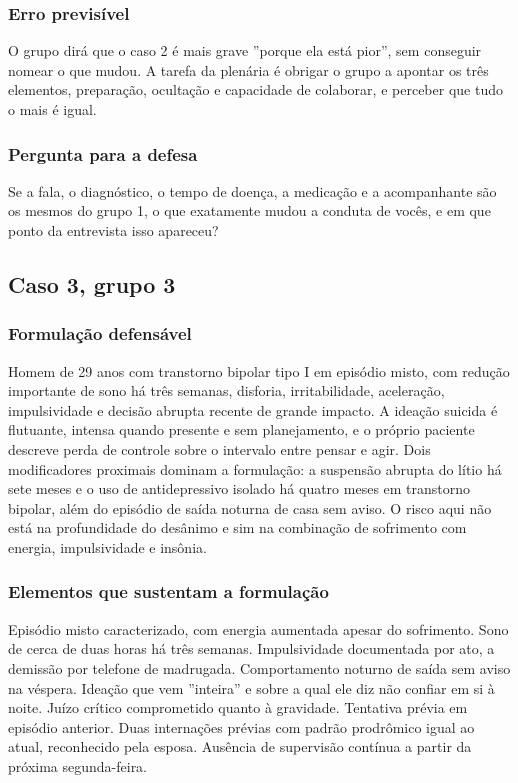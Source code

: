\subsubsection*{Erro previsível}

O grupo dirá que o caso 2 é mais grave ''porque ela está pior'', sem conseguir nomear o que mudou. A tarefa da plenária é obrigar o grupo a apontar os três elementos, preparação, ocultação e capacidade de colaborar, e perceber que tudo o mais é igual.

\subsubsection*{Pergunta para a defesa}

Se a fala, o diagnóstico, o tempo de doença, a medicação e a acompanhante são os mesmos do grupo 1, o que exatamente mudou a conduta de vocês, e em que ponto da entrevista isso apareceu?

\filete

\subsection*{Caso 3, grupo 3}

\subsubsection*{Formulação defensável}

Homem de 29 anos com transtorno bipolar tipo I em episódio misto, com redução importante de sono há três semanas, disforia, irritabilidade, aceleração, impulsividade e decisão abrupta recente de grande impacto. A ideação suicida é flutuante, intensa quando presente e sem planejamento, e o próprio paciente descreve perda de controle sobre o intervalo entre pensar e agir. Dois modificadores proximais dominam a formulação: a suspensão abrupta do lítio há sete meses e o uso de antidepressivo isolado há quatro meses em transtorno bipolar, além do episódio de saída noturna de casa sem aviso. O risco aqui não está na profundidade do desânimo e sim na combinação de sofrimento com energia, impulsividade e insônia.

\subsubsection*{Elementos que sustentam a formulação}

Episódio misto caracterizado, com energia aumentada apesar do sofrimento. Sono de cerca de duas horas há três semanas. Impulsividade documentada por ato, a demissão por telefone de madrugada. Comportamento noturno de saída sem aviso na véspera. Ideação que vem ''inteira'' e sobre a qual ele diz não confiar em si à noite. Juízo crítico comprometido quanto à gravidade. Tentativa prévia em episódio anterior. Duas internações prévias com padrão prodrômico igual ao atual, reconhecido pela esposa. Ausência de supervisão contínua a partir da próxima segunda-feira.

